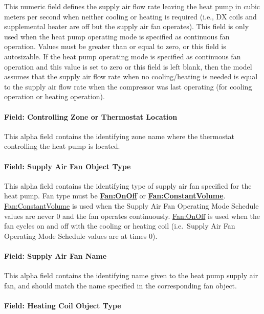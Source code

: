 This numeric field defines the supply air flow rate leaving the heat pump in cubic meters per second when neither cooling or heating is required (i.e., DX coils and supplemental heater are off but the supply air fan operates). This field is only used when the heat pump operating mode is specified as continuous fan operation. Values must be greater than or equal to zero, or this field is autosizable. If the heat pump operating mode is specified as continuous fan operation and this value is set to zero or this field is left blank, then the model assumes that the supply air flow rate when no cooling/heating is needed is equal to the supply air flow rate when the compressor was last operating (for cooling operation or heating operation).

\paragraph{Field: Controlling Zone or Thermostat Location}\label{field-controlling-zone-or-thermostat-location-3}

This alpha field contains the identifying zone name where the thermostat controlling the heat pump is located.

\paragraph{Field: Supply Air Fan Object Type}\label{field-supply-air-fan-object-type}

This alpha field contains the identifying type of supply air fan specified for the heat pump. Fan type must be \textbf{\hyperref[fanonoff]{Fan:OnOff}} or \textbf{\hyperref[fanconstantvolume]{Fan:ConstantVolume}}. \hyperref[fanconstantvolume]{Fan:ConstantVolume} is used when the Supply Air Fan Operating Mode Schedule values are never 0 and the fan operates continuously. \hyperref[fanonoff]{Fan:OnOff} is used when the fan cycles on and off with the cooling or heating coil (i.e.~Supply Air Fan Operating Mode Schedule values are at times 0).

\paragraph{Field: Supply Air Fan Name}\label{field-supply-air-fan-name}

This alpha field contains the identifying name given to the heat pump supply air fan, and should match the name specified in the corresponding fan object.

\paragraph{Field: Heating Coil Object Type}\label{field-heating-coil-object-type-3}

